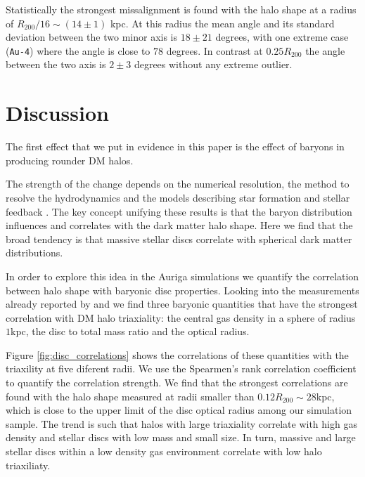 \documentclass[usenatbib]{mnras}
\begin{document}
Statistically the strongest missalignment is found with the halo shape
at a radius of $R_{200}/16\sim (14\pm1)$ kpc. 
At this radius the mean angle and its standard deviation between the
two minor axis is $18 \pm 21$ degrees, with one extreme case
(\texttt{Au-4}) where the angle is close to $78$ degrees. 
In contrast at $0.25 R_{200}$ the angle between the two axis is
$2\pm 3$ degrees without any extreme outlier.





\section{Discussion}
\label{sec:discussion}

The first effect that we put in evidence in this paper is the effect
of baryons in producing rounder DM halos.

The strength of the change depends on the numerical resolution, the
method to resolve the hydrodynamics and the models describing star
formation and stellar feedback \citep{Debattista08, Bryan13, Butsky16,
  Chua19, Artale19}.  
The key concept unifying these results is that the baryon distribution
influences and correlates with the dark matter halo shape. 
Here we find that the broad tendency is that massive stellar discs
correlate with spherical dark matter distributions. 

In order to explore this idea in the Auriga simulations we quantify
the correlation between halo shape with baryonic disc properties. 
Looking into the measurements already reported by \cite{auriga} and
\cite{Pakmor17} we find three baryonic quantities that have the
strongest correlation with DM halo triaxiality: the central gas
density in a sphere of radius $1$kpc, the disc to total mass ratio and
the optical radius.

Figure \ref{fig:disc_correlations} shows the correlations of
these quantities with the triaxility at five diferent radii.
We use the Spearmen's rank correlation coefficient to quantify the
correlation strength.
We find that the strongest correlations are found with the halo shape
measured at radii smaller than $0.12R_{200}\sim 28$kpc, which 
is close to the upper limit of the disc optical radius among our
simulation sample. 
The trend is such that halos with large triaxiality correlate with
high gas density and stellar discs with low mass and small size.
In turn, massive and large stellar discs within a low density gas
environment correlate with low halo triaxiliaty. 
\end{document}
